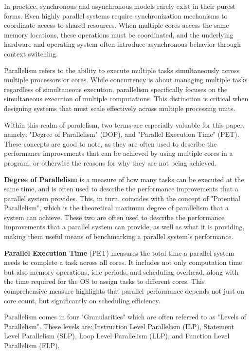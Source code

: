 \documentclass[12pt,a4paper]{article}
\begin{document}
In practice, synchronous and asynchronous models rarely exist in their purest forms. Even highly parallel systems require synchronization mechanisms to coordinate access to shared resources\parencite[p. 95]{Rauber2023}. When multiple cores access the same memory locations, these operations must be coordinated, and the underlying hardware and operating system often introduce asynchronous behavior through context switching.

Parallelism refers to the ability to execute multiple tasks simultaneously across multiple processors or cores\parencite[pp. 4-5]{Rauber2023}. While concurrency is about managing multiple tasks regardless of simultaneous execution, parallelism specifically focuses on the simultaneous execution of multiple computations. This distinction is critical when designing systems that must scale effectively across multiple processing units.

Within this realm of paralelism, two terms are especially valuable for this paper, namely: "Degree of Parallelism" (DOP), and "Parallel Execution Time" (PET). These concepts are good to note, as they are often used to describe the performance improvements that can be achieved by using multiple cores in a program, or otherwise the reasons for why they are not being achieved.

\textbf{Degree of Parallelism}\parencite[pp. 11-13]{Rauber2023} is a measure of how many tasks can be executed at the same time, and is often used to describe the performance improvements that a parallel system provides. This, in turn, coincides with the concept of "Potential Parallelism", which is the theoretical maximum degree of parallelism that a system can achieve. These two are often used to describe the performance improvements that a parallel system can provide, as well as what it is providing, making them useful means of benchmarking a parallel system's performance.

\textbf{Parallel Execution Time} (PET)\parencite[p. 5]{Rauber2023} measures the total time a parallel system needs to complete a task across all cores. It includes not only computation time but also memory operations, idle periods, and scheduling overhead, along with the time required for the OS to assign tasks to different cores. This comprehensive measure highlights that parallel performance depends not just on core count, but significantly on scheduling efficiency.

Parallelism comes in four "Granularities"\parencite[p. 4, 114]{Rauber2023} which are often referred to as "Levels of Parallelism". These levels are: Instruction Level Parallelism (ILP), Statement Level Parallelism (SLP), Loop Level Parallelism (LLP), and Function Level Parallelism (FLP).
\end{document}

